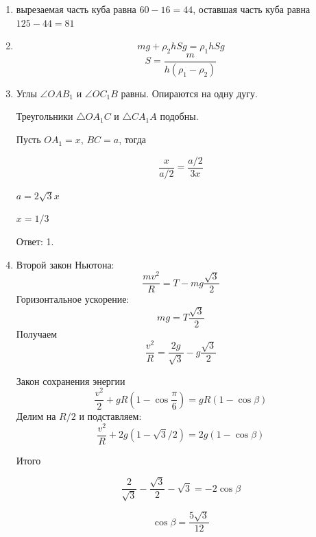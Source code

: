\documentclass[12pt]{article} %
\begin{document}
\begin{enumerate}
\item вырезаемая часть куба равна $60 - 16 = 44$, оставшая часть куба равна  $125 - 44 = 81$
\item 
\[ 
    mg + \rho_2 h Sg = \rho_1 h S g
\]
\[
    S = \frac{m}{h(\rho_1 - \rho_2)}
\]
\item Углы $\angle OAB_1$ и $\angle OC_1B$ равны. Опираются на одну дугу. 

Треугольники $\triangle OA_1C$ и $\triangle CA_1A$ подобны.

Пусть $OA_1 = x$, $BC = a$, тогда 

\[
\frac{x}{a/2} = \frac{a/2}{3x}  
\]

$a = 2\sqrt{3}x$

$x=1/3$

Ответ: 1.

\item Второй закон Ньютона:
\[
\frac{mv^2}{R} = T - mg \frac{\sqrt{3}}{2} 
\]
Горизонтальное ускорение:
\[
mg = T \frac{\sqrt{3}}{2}  
\]
Получаем 
\[
\frac{v^2}{R} = \frac{2g}{\sqrt{3}} - g \frac{\sqrt{3}}{2}  
\]

Закон сохранения энергии
\[
\frac{v^2}{2} +gR\left(1- \cos \frac{\pi}{6} \right)  = gR(1-\cos\beta)  
\]
Делим на $R/2$ и подставляем:
\[
\frac{v^2}{R} +2g(1- \sqrt{3}/2)  = 2g(1-\cos\beta)  
\]

Итого

\[
\frac{2}{\sqrt{3}} - \frac{\sqrt{3}}{2} - \sqrt{3} = -2\cos\beta  
\]

\[
\cos\beta = \frac{5\sqrt{3}}{12}
\]

\end{enumerate} 
  
\end{document}
